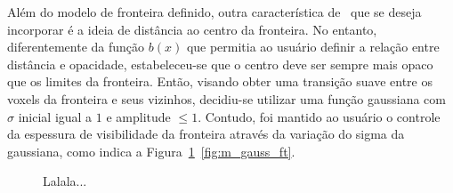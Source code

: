 	Além do modelo de fronteira definido, outra característica de~\cite{gordon} que se deseja incorporar é a ideia de distância ao centro da fronteira. No entanto, diferentemente da função $ b(x) $ que permitia ao usuário definir a relação entre distância e opacidade, estabeleceu-se que o centro deve ser sempre mais opaco que os limites da fronteira. Então, visando obter uma transição suave entre os voxels da fronteira e seus vizinhos, decidiu-se utilizar uma função gaussiana com $ \sigma $ inicial igual a $ 1 $ e amplitude $ \le 1 $. Contudo, foi mantido ao usuário o controle da espessura de visibilidade da fronteira através da variação do sigma da gaussiana, como indica a Figura~\ref{fig:m_gauss}~\ref{fig:m_gauss_ft}.
	
\begin{figure}[h]
	\centering
	\label{fig:m_gauss}
	\caption{Lalala...}
\end{figure}
	
